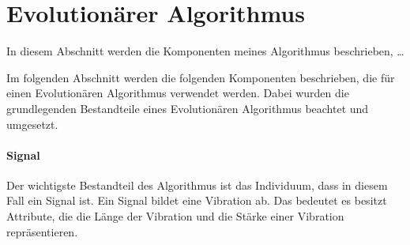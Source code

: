 



\section{Evolution{\"a}rer Algorithmus}

In diesem Abschnitt werden die Komponenten meines Algorithmus beschrieben, \dots

Im folgenden Abschnitt werden die folgenden Komponenten beschrieben, die f{\"u}r einen Evolution{\"a}ren Algorithmus verwendet werden. Dabei wurden die grundlegenden Bestandteile eines Evolution{\"a}ren Algorithmus beachtet und umgesetzt. 

\paragraph*{Signal}
Der wichtigste Bestandteil des Algorithmus ist das Individuum, dass in diesem Fall ein Signal ist. Ein Signal bildet eine Vibration ab. 
Das bedeutet es besitzt Attribute, die die L{\"a}nge der Vibration und die St{\"a}rke einer Vibration repr{\"a}sentieren.

